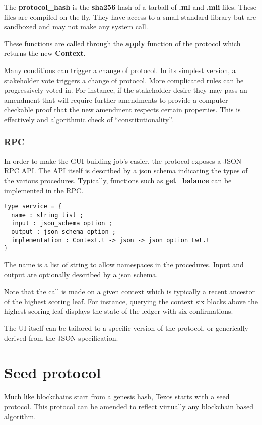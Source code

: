 \documentclass[letterpaper]{article}
\begin{document}
The \textbf{protocol\_hash} is the \textbf{sha256} hash of a tarball of
\textbf{.ml} and \textbf{.mli} files. These files are compiled on the
fly. They have access to a small standard library but are sandboxed
and may not make any system call.

These functions are called through the \textbf{apply} function of the protocol
which returns the new \textbf{Context}.

Many conditions can trigger a change of protocol. In its simplest version,
a stakeholder vote triggers a change of protocol. More complicated rules
can be progressively voted in. For instance, if the stakeholder desire they
may pass an amendment that will require further amendments to provide a
computer checkable proof that the new amendment respects certain properties.
This is effectively and algorithmic check of ``constitutionality''.

\subsubsection{RPC}
In order to make the GUI building job's easier, the protocol exposes a JSON-RPC
API. The API itself is described by a json schema indicating the types of the
various procedures. Typically, functions such as \textbf{get\_balance} can
be implemented in the RPC.

\begin{lstlisting}
type service = {
  name : string list ;
  input : json_schema option ;
  output : json_schema option ;
  implementation : Context.t -> json -> json option Lwt.t
}
\end{lstlisting}

The name is a list of string to allow namespaces in the procedures. Input and
output are optionally described by a json schema.

Note that the call is made on a given context which is typically a recent ancestor
of the highest scoring leaf. For instance, querying the context six blocks above
the highest scoring leaf displays the state of the ledger with six confirmations.

The UI itself can be tailored to a specific version of the protocol, or generically
derived from the JSON specification.

\section{Seed protocol}
Much like blockchains start from a genesis hash, Tezos starts with a seed
protocol. This protocol can be amended to reflect virtually any blockchain based
algorithm.
\end{document}
